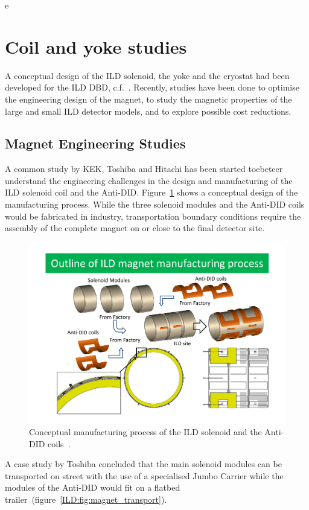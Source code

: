 e\section{Coil and yoke studies}

A conceptual design of the ILD solenoid, the yoke and the cryostat had been developed for the ILD DBD, c.f.~\cite{ild:bib:Magnet_Note, ild:bib:Cryostat_Note}. Recently, studies have been done to optimise the engineering design of the magnet, to study the magnetic properties of the large and small ILD detector models, and to explore possible cost reductions.

\subsection{Magnet Engineering Studies}
A common study by KEK, Toshiba and Hitachi has been started toebeteer understand the engineering challenges in the design and manufacturing of the ILD solenoid coil and the Anti-DID. Figure~\ref{ILD:fig:solenoid_manufacturing} shows a conceptual design of the manufacturing process. While the three solenoid modules and the Anti-DID coils would be fabricated in industry, transportation boundary conditions require the assembly of the complete magnet on or close to the final detector site.
\begin{figure}[h!]
    \centering
    \includegraphics[width=0.8\hsize]{Integration/fig/Solenoid_Manufacturing.pdf}
    \caption{Conceptual manufacturing process of the ILD solenoid and the Anti-DID coils~\cite{ild:bib:Solenoid_Manufacturing}.}
    \label{ILD:fig:solenoid_manufacturing}
\end{figure}
A case study by Toshiba concluded that the main solenoid modules can be transported on street with the use of a specialised Jumbo Carrier while the modules of the Anti-DID would fit on a flatbed trailer~(figure~\ref{ILD:fig:magnet_transport}).
